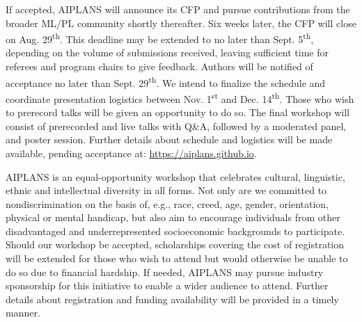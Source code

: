 \documentclass{article}
\begin{document}
    If accepted, AIPLANS will announce its CFP and pursue contributions from the broader ML/PL community shortly thereafter. Six weeks later, the CFP will close on Aug. 29\textsuperscript{th}. This deadline may be extended to no later than Sept. 5\textsuperscript{th}, depending on the volume of submissions received, leaving sufficient time for referees and program chairs to give feedback. Authors will be notified of acceptance no later than Sept. 29\textsuperscript{th}. We intend to finalize the schedule and coordinate presentation logistics between Nov. 1\textsuperscript{st} and Dec. 14\textsuperscript{th}. Those who wish to prerecord talks will be given an opportunity to do so. The final workshop will consist of prerecorded and live talks with Q\&A, followed by a moderated panel, and poster session. Further details about schedule and logistics will be made available, pending acceptance at: \url{https://aiplans.github.io}.

    AIPLANS is an equal-opportunity workshop that celebrates cultural, linguistic, ethnic and intellectual diversity in all forms. Not only are we committed to nondiscrimination on the basis of, e.g., race, creed, age, gender, orientation, physical or mental handicap, but also aim to encourage individuals from other disadvantaged and underrepresented socioeconomic backgrounds to participate. Should our workshop be accepted, scholarships covering the cost of registration will be extended for those who wish to attend but would otherwise be unable to do so due to financial hardship. If needed, AIPLANS may pursue industry sponsorship for this initiative to enable a wider audience to attend. Further details about registration and funding availability will be provided in a timely manner.


    \newpage
\end{document}
